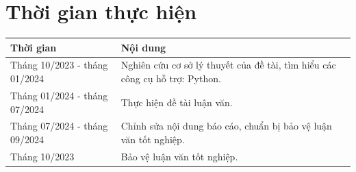 \documentclass[a4paper]{elsarticle}
\begin{document}
\section{Thời gian thực hiện}
\begin{tabular}{|>{\centering\arraybackslash}m{6cm}|>{\centering\arraybackslash}m{9cm}|}
	\hline
	\textbf{Thời gian} & \textbf{Nội dung}\\
	\hline
	Tháng 10/2023 - tháng 01/2024 & Nghiên cứu cơ sở lý thuyết của đề tài, tìm hiểu các công cụ hỗ trợ: Python.\\
	\hline
	Tháng 01/2024 - tháng 07/2024 & Thực hiện đề tài luận văn.\\
	\hline
	Tháng 07/2024 - tháng 09/2024 & Chỉnh sửa nội dung báo cáo, chuẩn bị bảo vệ luận văn tốt nghiệp.\\
	\hline
	Tháng 10/2023 & Bảo vệ luận văn tốt nghiệp.\\
	\hline
\end{tabular}


\end{document}
